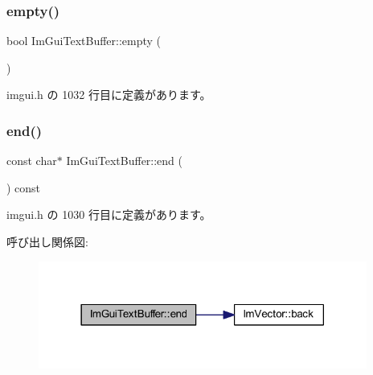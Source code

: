 \subsubsection{\texorpdfstring{empty()}{empty()}}
{\footnotesize\ttfamily bool Im\+Gui\+Text\+Buffer\+::empty (\begin{DoxyParamCaption}{ }\end{DoxyParamCaption})\hspace{0.3cm}{\ttfamily [inline]}}



 imgui.\+h の 1032 行目に定義があります。

\mbox{\label{struct_im_gui_text_buffer_a2fc30ad0d384f98dfcea722f798d91f2}} 
\subsubsection{\texorpdfstring{end()}{end()}}
{\footnotesize\ttfamily const char$\ast$ Im\+Gui\+Text\+Buffer\+::end (\begin{DoxyParamCaption}{ }\end{DoxyParamCaption}) const\hspace{0.3cm}{\ttfamily [inline]}}



 imgui.\+h の 1030 行目に定義があります。

呼び出し関係図\+:\nopagebreak
\begin{figure}[H]
\begin{center}
\leavevmode
\includegraphics[width=306pt]{struct_im_gui_text_buffer_a2fc30ad0d384f98dfcea722f798d91f2_cgraph}
\end{center}
\end{figure}
\mbox{\label{struct_im_gui_text_buffer_a8550f53463fd12711e3d08b740227bd4}} 
